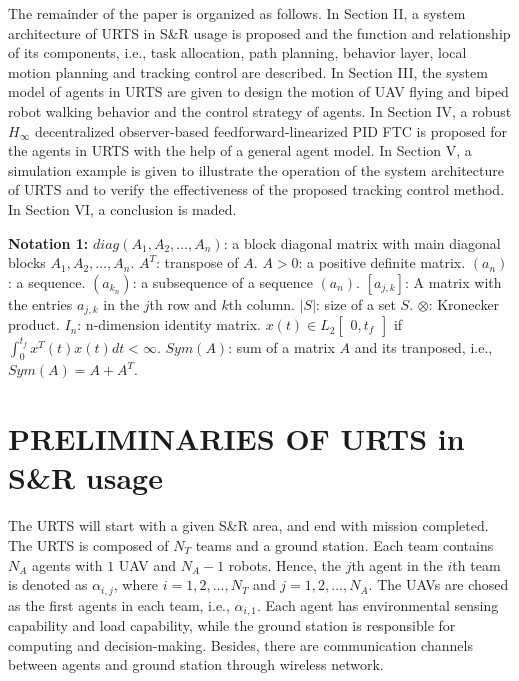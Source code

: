\documentclass{ieeeaccess}
\begin{document}
The remainder of the paper is organized as follows. In Section II, a system architecture of URTS in S\&R usage is proposed and the function and relationship of its components, i.e., task allocation, path planning, behavior layer, local motion planning and tracking control are described. In Section III, the system model of agents in URTS are given to design the motion of UAV flying and biped robot walking behavior and the control strategy of agents. In Section IV, a robust $H_\infty$ decentralized observer-based feedforward-linearized PID FTC is proposed for the agents in URTS with the help of a general agent model. In Section V, a simulation example is given to illustrate the operation of the system architecture of URTS and to verify the effectiveness of the proposed tracking control method. In Section VI, a conclusion is maded.

\textbf{Notation 1:} 
$diag(A_1, A_2, \dots, A_n)$: a block diagonal matrix with main diagonal blocks $A_1, A_2, \dots, A_n$. $A^T$: transpose of $A$. $A > 0$: a positive definite matrix. $(a_n)$: a sequence. $(a_{k_n})$: a subsequence of a sequence $(a_n)$. $[a_{j,k}]$: A matrix with the entries $a_{j,k}$ in the $j$th row and $k$th column. $\vert{S}\vert$: size of a set $S$. $\otimes$: Kronecker product. $I_n$: n-dimension identity matrix. $x(t)\in L_2\begin{bmatrix}
    0,t_f 
\end{bmatrix}$ if $\int^{t_f}_{0}x^T(t)x(t)dt<\infty$. $Sym(A)$: sum of a matrix $A$ and its tranposed, i.e., $Sym(A) = A+A^T$.

\section{PRELIMINARIES OF URTS in S\&R usage}
The URTS will start with a given S\&R area, and end with mission completed. The URTS is composed of $N_T$ teams and a ground station. Each team contains $N_A$ agents with $1$ UAV and $N_A-1$ robots. Hence, the $j$th agent in the $i$th team is denoted as $\alpha_{i,j}$, where $i=1,2,...,N_T$ and $j=1,2,...,N_A$. The UAVs are chosed as the first agents in each team, i.e., $\alpha_{i,1}$. Each agent has environmental sensing capability and load capability, while the ground station is responsible for computing and decision-making. Besides, there are communication channels between agents and ground station through wireless network.
\end{document}

